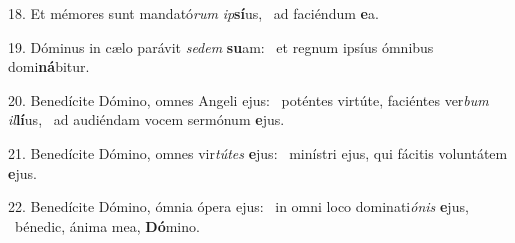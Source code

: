 18. Et mémores sunt mandató\textit{rum} \textit{ip}\textbf{sí}us, \ast\  ad faciéndum \textbf{e}a.\

19. Dóminus in cælo parávit \textit{se}\textit{dem} \textbf{su}am: \ast\  et regnum ipsíus ómnibus domi\textbf{ná}bitur.\

20. Benedícite Dómino, omnes Angeli ejus: \dag\  poténtes virtúte, faciéntes ver\textit{bum} \textit{il}\textbf{lí}us, \ast\  ad audiéndam vocem sermónum \textbf{e}jus.\

21. Benedícite Dómino, omnes vir\textit{tú}\textit{tes} \textbf{e}jus: \ast\  minístri ejus, qui fácitis voluntátem \textbf{e}jus.\

22. Benedícite Dómino, ómnia ópera ejus: \dag\  in omni loco dominati\textit{ó}\textit{nis} \textbf{e}jus, \ast\  bénedic, ánima mea, \textbf{Dó}mino.\

